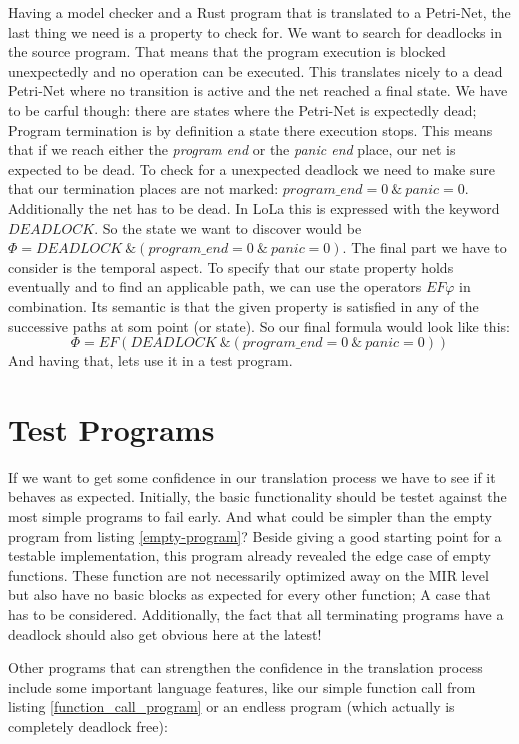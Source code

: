 Having a model checker and a Rust program that is translated to a Petri-Net, the last thing we need is a property to check for.
We want to search for deadlocks in the source program.
That means that the program execution is blocked unexpectedly and no operation can be executed.
This translates nicely to a dead Petri-Net where no transition is active and the net reached a final state.
We have to be carful though: there are states where the Petri-Net is expectedly dead;
Program termination is by definition a state there execution stops.
This means that if we reach either the \textit{program end} or the \textit{panic end} place, our net is expected to be dead.
To check for a unexpected deadlock we need to make sure that our termination places are not marked: $program\_end = 0\ \&\ panic = 0$.
Additionally the net has to be dead.
In LoLa this is expressed with the keyword $DEADLOCK$.
So the state we want to discover would be $\Phi=DEADLOCK\ \& (program\_end = 0\ \&\ panic = 0)$.
The final part we have to consider is the temporal aspect.
To specify that our state property holds eventually and to find an applicable path, we can use the operators $EF\varphi$ in combination.
Its semantic is that the given property is satisfied in any of the successive paths at som point (or state).
So our final formula would look like this:
$$\Phi = EF(DEADLOCK\ \& (program\_end = 0\ \&\  panic = 0))$$
And having that, lets use it in a test program.

\section{Test Programs}
\label{app_test}
If we want to get some confidence in our translation process we have to see if it behaves as expected.
Initially, the basic functionality should be testet against the most simple programs to fail early.
And what could be simpler than the empty program from listing \ref{empty-program}?
Beside giving a good starting point for a testable implementation, this program already revealed the edge case of empty functions.
These function are not necessarily optimized away on the MIR level but also have no basic blocks as expected for every other function;
A case that has to be considered.
Additionally, the fact that all terminating programs have a deadlock should also get obvious here at the latest!

Other programs that can strengthen the confidence in the translation process include some important language features, like our simple function call from listing \ref{function_call_program} or an endless program (which actually is completely deadlock free):

